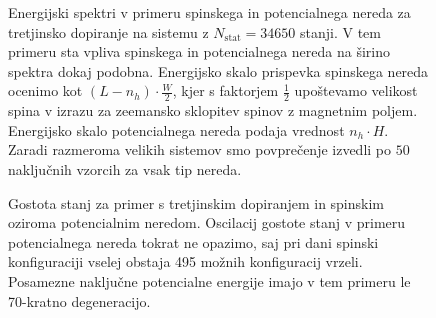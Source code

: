  \begin{figure}[H]
\caption{Energijski spektri v primeru spinskega in potencialnega nereda za tretjinsko dopiranje na sistemu z $N_\mathrm{stat}=34650$ stanji. V tem primeru sta vpliva spinskega in potencialnega nereda na širino spektra dokaj podobna. Energijsko skalo prispevka spinskega nereda ocenimo kot $(L-n_h)\cdot \frac{W}{2}$, kjer s faktorjem $\frac{1}{2}$ upoštevamo velikost spina v izrazu za zeemansko sklopitev spinov z magnetnim poljem. Energijsko skalo potencialnega nereda podaja vrednost $n_h\cdot H$. Zaradi razmeroma velikih sistemov smo povprečenje izvedli po $50$ naključnih vzorcih za vsak tip nereda.   }
\label{fig:Eigenstates_spin_hole_disorder_12_4_4.pdf}
\end{figure}
 \begin{figure}[H]
\caption{Gostota stanj za primer s tretjinskim dopiranjem in spinskim oziroma potencialnim neredom. Oscilacij gostote stanj v primeru potencialnega nereda tokrat ne opazimo, saj pri dani spinski konfiguraciji vselej obstaja 495 možnih konfiguracij vrzeli. Posamezne naključne potencialne energije imajo v tem primeru le 70-kratno degeneracijo. }
\label{fig:DOS_spin_hole_disorder_12_4_4.pdf}
\end{figure}


